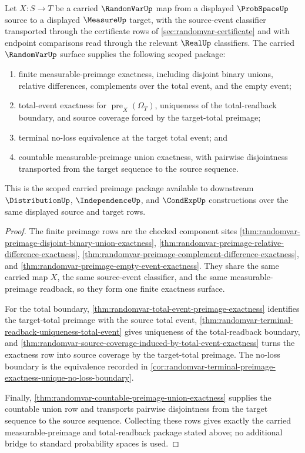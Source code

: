 \begin{theorem}
\label{thm:randomvar-scoped-closure-package}
Let $X:S\to T$ be a carried $\RandomVarUp$ map from a displayed $\ProbSpaceUp$ source to a displayed $\MeasureUp$ target, with the source-event classifier transported through the certificate rows of \autoref{sec:randomvar-certificate} and with endpoint comparisons read through the relevant $\RealUp$ classifiers. The carried $\RandomVarUp$ surface supplies the following scoped package:
\begin{enumerate}
\item finite measurable-preimage exactness, including disjoint binary unions, relative differences, complements over the total event, and the empty event;
\item total-event exactness for $\operatorname{pre}_X(\Omega_T)$, uniqueness of the total-readback boundary, and source coverage forced by the target-total preimage;
\item terminal no-loss equivalence at the target total event; and
\item countable measurable-preimage union exactness, with pairwise disjointness transported from the target sequence to the source sequence.
\end{enumerate}
This is the scoped carried preimage package available to downstream $\DistributionUp$, $\IndependenceUp$, and $\CondExpUp$ constructions over the same displayed source and target rows.
\end{theorem}
\begin{proof}
The finite preimage rows are the checked component sites \autoref{thm:randomvar-preimage-disjoint-binary-union-exactness}, \autoref{thm:randomvar-preimage-relative-difference-exactness}, \autoref{thm:randomvar-preimage-complement-difference-exactness}, and \autoref{thm:randomvar-preimage-empty-event-exactness}. They share the same carried map $X$, the same source-event classifier, and the same measurable-preimage readback, so they form one finite exactness surface.

For the total boundary, \autoref{thm:randomvar-total-event-preimage-exactness} identifies the target-total preimage with the source total event, \autoref{thm:randomvar-terminal-readback-uniqueness-total-event} gives uniqueness of the total-readback boundary, and \autoref{thm:randomvar-source-coverage-induced-by-total-event-exactness} turns the exactness row into source coverage by the target-total preimage. The no-loss boundary is the equivalence recorded in \autoref{cor:randomvar-terminal-preimage-exactness-unique-no-loss-boundary}.

Finally, \autoref{thm:randomvar-countable-preimage-union-exactness} supplies the countable union row and transports pairwise disjointness from the target sequence to the source sequence. Collecting these rows gives exactly the carried measurable-preimage and total-readback package stated above; no additional bridge to standard probability spaces is used.
\end{proof}

